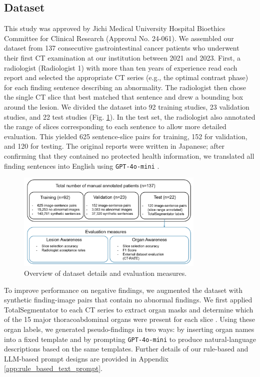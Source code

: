 \documentclass[bioengineering,article,submit,pdftex,moreauthors]{Definitions/mdpi}
\begin{document}
\subsection{Dataset}\label{sec:dataset}
This study was approved by Jichi Medical University Hospital Bioethics Committee for Clinical Research (Approval No. 24-061). 
We assembled our dataset from 137 consecutive gastrointestinal cancer patients who underwent their ﬁrst CT examination at our institution between 2021 and 2023. 
First, a radiologist (Radiologist 1) with more than ten years of experience read each report and selected the appropriate CT series (e.g., the optimal contrast phase) for each finding sentence describing an abnormality. 
The radiologist then chose the single CT slice that best matched that sentence and drew a bounding box around the lesion. 
We divided the dataset into 92 training studies, 23 validation studies, and 22 test studies (Fig. \ref{fig:dataset_detail}). 
In the test set, the radiologist also annotated the range of slices corresponding to each sentence to allow more detailed evaluation. 
This yielded 625 sentence-slice pairs for training, 152 for validation, and 120 for testing. 
The original reports were written in Japanese; after confirming that they contained no protected health information, we translated all finding sentences into English using \texttt{GPT-4o-mini} \cite{openai_gpt-4_2024}. 

\begin{figure}[ht]
  \centering
  \includegraphics[width=0.8\textwidth]{./figures/dataset_detail_1.png}
  \caption{
    Overview of dataset details and evaluation measures.
  }
  \label{fig:dataset_detail}
\end{figure}

To improve performance on negative findings, we augmented the dataset with synthetic finding-image pairs that contain no abnormal findings. 
We first applied TotalSegmentator to each CT series to extract organ masks and determine which of the 15 major thoracoabdominal organs were present for each slice \cite{wasserthal_totalsegmentator_2023}. 
Using these organ labels, we generated pseudo-findings in two ways: by inserting organ names into a fixed template and by prompting \texttt{GPT-4o-mini} to produce natural-language descriptions based on the same templates. 
Further details of our rule-based and LLM-based prompt designs are provided in Appendix \ref{app:rule_based_text_prompt}.
\end{document}

